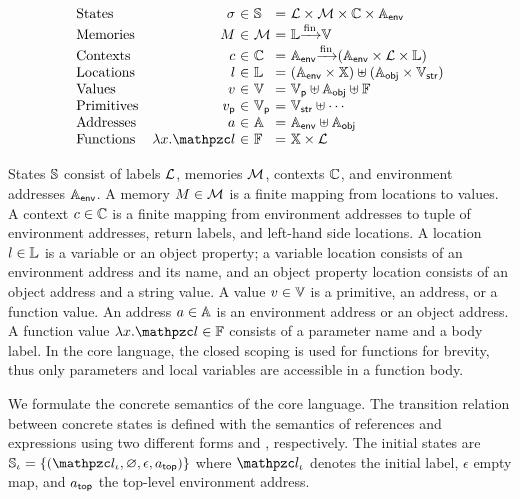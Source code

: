 \[
  \begin{array}{lr@{~}c@{~}l@{~}c@{~}l}
    \text{States} & \st &\in& \stset &=& \labset \times \memset \times
    \ctxtset \times \eaddrset\\
    \text{Memories} & \mem &\in& \memset &=& \locset \finmap \valset\\
    \text{Contexts} & \ctxt &\in& \ctxtset &=& \eaddrset \finmap (\eaddrset
    \times \labset \times \locset)\\
    \text{Locations} & \loc &\in& \locset &=& (\eaddrset \times \varset) \uplus
    (\oaddrset \times \strset)\\
    \text{Values} & \val &\in& \valset &=& \pvalset \uplus \oaddrset \uplus
    \fvalset\\
    \text{Primitives} & \pval &\in& \pvalset &=& \strset \uplus \cdots\\
    \text{Addresses} & \addr &\in& \addrset &=& \eaddrset \uplus \oaddrset\\
    \text{Functions} & \fval{x}{\lab} &\in& \fvalset &=& \varset \times
    \labset\\
  \end{array}
\]

States $\mathbb{S}$ consist of labels $\mathcal{L}$, memories $\mathcal{M}$, contexts
$\mathbb{C}$, and environment addresses $\mathbb{A}_{\textsf{env}}$.  A memory $M \in \mathcal{M}$
is a finite mapping from locations to values.  A context $c \in \mathbb{C}$ is
a finite mapping from environment addresses to tuple of environment addresses,
return labels, and left-hand side locations.  A location $l \in \mathbb{L}$ is a
variable or an object property; a variable location consists of an environment
address and its name, and an object property location consists of an object
address and a string value.  A value $v \in \mathbb{V}$ is a primitive, an
address, or a function value.  An address $a \in \mathbb{A}$ is an environment
address or an object address.  A function value $\fval{x}{\lab} \in \fvalset$
consists of a parameter name and a body label.  In the core language, the closed
scoping is used for functions for brevity, thus only parameters and local
variables are accessible in a function body.

We formulate the concrete semantics of the core language.  The transition
relation between concrete states is defined with the semantics of references and
expressions using two different forms  and
\fbox{$\exprrule{\st}{\expr}{\val}$}, respectively.  The initial states are
$\istset = \{ (\ilab, \varnothing, \epsilon, \tladdr) \}$ where $\ilab$ denotes
the initial label, $\epsilon$ empty map, and $a_{\textsf{top}}$ the top-level environment address.

